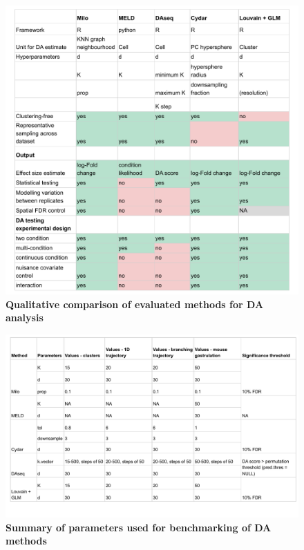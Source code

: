 \documentclass[
]{article}
\begin{document}
\begin{figure}
\centering
\includegraphics{suppl_tables/table_methods_comparison.pdf}
\caption{\label{fig:sup-tab-1}\textbf{Qualitative comparison of evaluated methods for DA analysis}}
\end{figure}



\begin{figure}
\centering
\includegraphics{suppl_tables/table_methods_params.pdf}
\caption{\label{fig:sup-tab-3}\textbf{Summary of parameters used for benchmarking of DA methods}}
\end{figure}



\newpage
\end{document}
